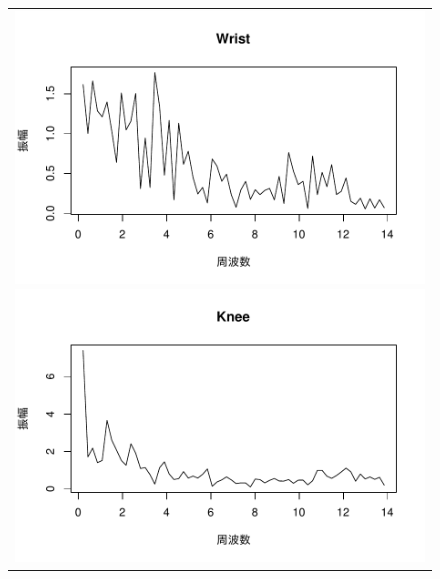 \documentclass[a4j]{cis-resume}
\begin{document}
\begin{figure}[H]
  \begin{flushleft}
  \vspace{15mm}
  \begin{tabular}{c}
    \begin{minipage}{0.3\linewidth}
      \begin{flushleft}
        \includegraphics[keepaspectration,scale=0.3\figscale,angle=0]{Wrist.pdf}
      \end{flushleft}
    \end{minipage}
    \begin{minipage}{0.1\linewidth}
      \hspace{2mm}
    \end{minipage}
    \begin{minipage}{0.3\linewidth}
      \begin{center}
        \includegraphics[keepaspectration,scale=0.3\figscale,angle=0]{Knee.pdf}

\end{center}
\end{minipage}
\end{tabular}
\end{flushleft}
\end{figure}
\end{document}
